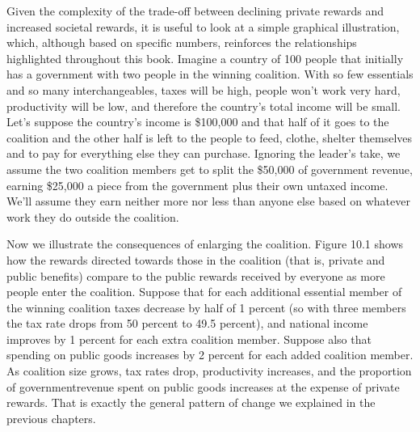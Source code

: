 \documentclass[10pt]{article}
\begin{document}
{\large Given the complexity of the trade-off between declining private rewards
and increased societal rewards, it is useful to look at a simple graphical
illustration, which, although based on specific numbers, reinforces the
relationships highlighted throughout this book. Imagine a country of 100 people
that initially has a government with two people in the winning coalition. With so
few essentials and so many interchangeables, taxes will be high, people won't
work very hard, productivity will be low, and therefore the country's total
income will be small. Let's suppose the country's income is \$100,000 and that
half of it goes to the coalition and the other half is left to the people to
feed, clothe, shelter themselves and to pay for everything else they can
purchase. Ignoring the leader's take, we assume the two coalition members get to
split the \$50,000 of government revenue, earning \$25,000 a piece from the
government plus their own untaxed income. We'll assume they earn neither more nor
less than anyone else based on whatever work they do outside the coalition.}

{\large Now we illustrate the consequences of enlarging the coalition. Figure
10.1 shows how the rewards directed towards those in the coalition (that is,
private and public benefits) compare to the public rewards received by everyone
as more people enter the coalition. Suppose that for each additional essential
member of the winning coalition taxes decrease by half of 1 percent (so with
three members the tax rate drops from 50 percent to 49.5 percent), and national
income improves by 1 percent for each extra coalition member. Suppose also that
spending on public goods increases by 2 percent for each added coalition member.
As coalition size grows, tax rates drop, productivity increases, and the
proportion of governmentrevenue spent on public goods increases at the expense of
private rewards. That is exactly the general pattern of change we explained in
the previous chapters.}
\end{document}
